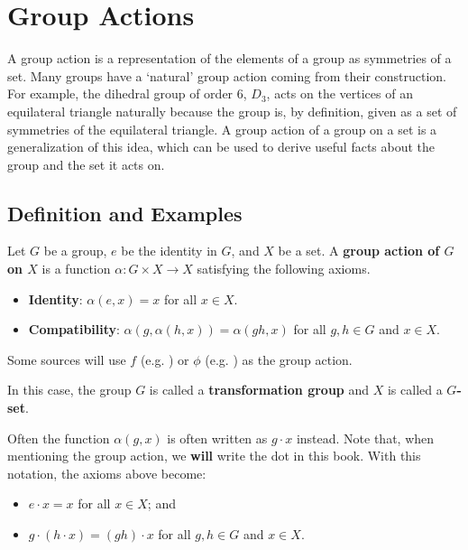 \chapter{Group Actions}
A group action is a representation of the elements of a group as symmetries of a set. Many groups have a `natural' group action coming from their construction. For example, the dihedral group of order 6, $D_3$, acts on the vertices of an equilateral triangle naturally because the group is, by definition, given as a set of symmetries of the equilateral triangle. A group action of a group on a set is a generalization of this idea, which can be used to derive useful facts about the group and the set it acts on.

\section{Definition and Examples}
\begin{definition}\label{definition-group-action}
    Let $G$ be a group, $e$ be the identity in $G$, and $X$ be a set. A \textbf{group action of $G$ on $X$} is a function $\alpha: G \times X \to X$ satisfying the following axioms.
    \begin{itemize}
        \item \textbf{Identity}: $\alpha(e, x) = x$ for all $x \in X$.
        \item \textbf{Compatibility}: $\alpha(g, \alpha(h, x)) = \alpha(gh, x)$ for all $g, h \in G$ and $x \in X$.
    \end{itemize}
\end{definition}
\begin{remark}
    Some sources will use $f$ (e.g. \cite{brilliant_group-actions}) or $\phi$ (e.g. \cite{rowland_group-action}) as the group action.
\end{remark}
In this case, the group $G$ is called a \textbf{transformation group} and $X$ is called a \textbf{$G$-set}.

\newpage

Often the function $\alpha(g, x)$ is often written as $g \cdot x$ instead. Note that, when mentioning the group action, we \textbf{will} write the dot in this book. With this notation, the axioms above become:
\begin{itemize}
    \item $e \cdot x = x$ for all $x \in X$; and
    \item $g \cdot (h \cdot x) = (gh) \cdot x$ for all $g, h \in G$ and $x \in X$.
\end{itemize}

